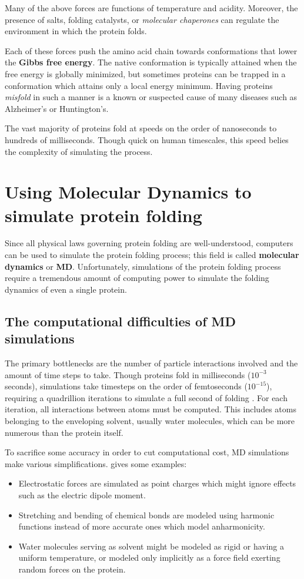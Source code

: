 \documentclass{article}
\begin{document}
Many of the above forces are functions of temperature and acidity. Moreover, the presence of salts, folding catalysts, or \textit{molecular chaperones} can regulate the environment in which the protein folds.

Each of these forces push the amino acid chain towards conformations that lower the \textbf{Gibbs free energy}. The native conformation is typically attained when the free energy is globally minimized, but sometimes proteins can be trapped in a conformation which attains only a local energy minimum. Having proteins \textit{misfold} in such a manner is a known or suspected cause of many diseases such as Alzheimer's or Huntington's.

The vast majority of proteins fold at speeds on the order of nanoseconds to hundreds of milliseconds. Though quick on human timescales, this speed belies the complexity of simulating the process.

\section{Using Molecular Dynamics to simulate protein folding}
Since all physical laws governing protein folding are well-understood, computers can be used to simulate the protein folding process; this field is called \textbf{molecular dynamics} or \textbf{MD}. Unfortunately, simulations of the protein folding process require a tremendous amount of computing power to simulate the folding dynamics of even a single protein. 

\subsection{The computational difficulties of MD simulations}
The primary bottlenecks are the number of particle interactions involved and the amount of time steps to take. Though proteins fold in milliseconds ($10^{-3}$ seconds), simulations take timesteps on the order of femtoseconds ($10^{-15}$), requiring a quadrillion iterations to simulate a full second of folding \cite{md}. For each iteration, all interactions between atoms must be computed. This includes atoms belonging to the enveloping solvent, usually water molecules, which can be more numerous than the protein itself.

To sacrifice some accuracy in order to cut computational cost, MD simulations make various simplifications. \cite{md} gives some examples:

\begin{itemize}
    \item Electrostatic forces are simulated as point charges which might ignore effects such as the electric dipole moment.
    \item Stretching and bending of chemical bonds are modeled using harmonic functions instead of more accurate ones which model anharmonicity.
    \item Water molecules serving as solvent might be modeled as rigid or having a uniform temperature, or modeled only implicitly as a force field exerting random forces on the protein.
\end{itemize} 
\end{document}
